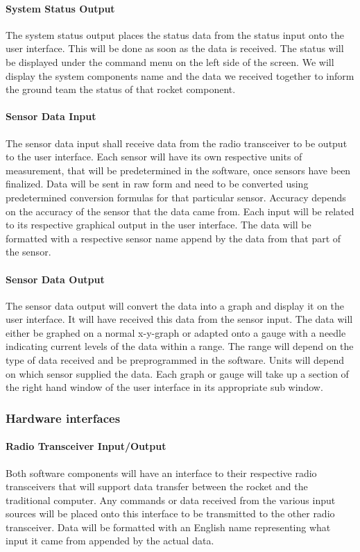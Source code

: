 \documentclass[10pt,draftclsnofoot,onecolumn,retainorgcmds]{IEEEtran}
\begin{document}
\paragraph{\bf System Status Output}
The system status output places the status data from the status input onto the user interface. This will be done as soon as the data is received. The status will be displayed under the command menu on the left side of the screen. We will display the system components name and the data we received together to inform the ground team the status of that rocket component.

\paragraph{\bf Sensor Data Input}
The sensor data input shall receive data from the radio transceiver to be output to the user interface. Each sensor will have its own respective units of measurement, that will be predetermined in the software, once sensors have been finalized. Data will be sent in raw form and need to be converted using predetermined conversion formulas for that particular sensor. Accuracy depends on the accuracy of the sensor that the data came from. Each input will be related to its respective graphical output in the user interface. The data will be formatted with a respective sensor name append by the data from that part of the sensor.

\paragraph{\bf Sensor Data Output}
The sensor data output will convert the data into a graph and display it on the user interface. It will have received this data from the sensor input. The data will either be graphed on a normal x-y-graph or adapted onto a gauge with a needle indicating current levels of the data within a range. The range will depend on the type of data received and be preprogrammed in the software. Units will depend on which sensor supplied the data. Each graph or gauge will take up a section of the right hand window of the user interface in its appropriate sub window. 


\subsubsection{Hardware interfaces }
\paragraph{\bf Radio Transceiver Input/Output}
Both software components will have an interface to their respective radio transceivers that will support data transfer between the rocket and the traditional computer. Any commands or data received from the various input sources will be placed onto this interface to be transmitted to the other radio transceiver. Data will be formatted with an English name representing what input it came from appended by the actual data.
\end{document}
